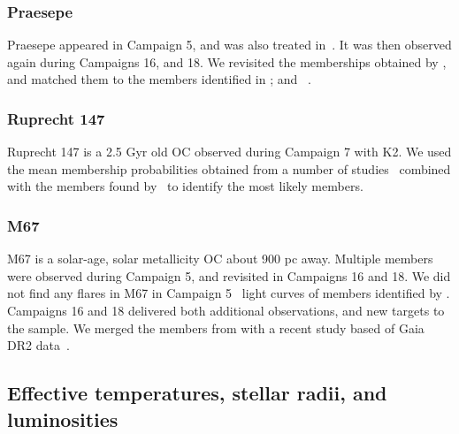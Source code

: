 \documentclass{aa}
\begin{document}
\subsubsection{Praesepe}
Praesepe appeared in Campaign 5, and was also treated in~. It was then observed again during Campaigns 16, and 18. We revisited the memberships obtained by \citet{douglas_praesepe_hyades_2014}, and matched them to the members identified in \citet{douglas_poking_2017, rebull_praesepe_2017,cantat_gaudin_2018}; and ~\citet{gaia_dr2_2018_hrd}.
\subsubsection{Ruprecht 147}
Ruprecht 147 is a 2.5 Gyr old OC observed during Campaign 7 with K2. We used the mean membership probabilities obtained from a number of studies~\citep{curtis_ruprecht_2013, cantat_gaudin_2018, olivares_ngc6774_2019} combined with the members found by~\citet{gaia_dr2_2018_hrd} to identify the most likely members.
\subsubsection{M67}
M67 is a solar-age, solar metallicity OC about 900 pc away. Multiple members were observed during Campaign 5, and revisited in Campaigns 16 and 18. We did not find any flares in M67 in Campaign 5~ light curves of members identified by \citet{gonzalez_m67mem_2016}. Campaigns 16 and 18 delivered both additional observations, and new targets to the sample. We merged the members from \citet{gonzalez_m67mem_2016} with a recent study based of Gaia DR2 data~\citep{gao_m67mem_2018}.
\subsection{Effective temperatures, stellar radii, and luminosities}
\label{TeffRL}

\end{document}
